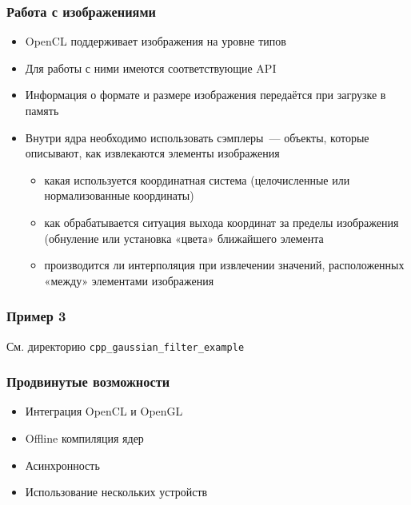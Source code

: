 \documentclass[
    aspectratio=169,
]{beamer}
\begin{document}
\begin{frame}
    \frametitle{Работа с изображениями}

    \begin{itemize}
        \item OpenCL поддерживает изображения на уровне типов
        \item Для работы с ними имеются соответствующие API
        \item Информация о формате и размере изображения передаётся при загрузке в память
        \item Внутри ядра необходимо использовать сэмплеры~--- объекты, которые описывают, как извлекаются элементы изображения
              \begin{itemize}
                  \item какая используется координатная система (целочисленные или нормализованные координаты)
                  \item как обрабатывается ситуация выхода координат за пределы изображения (обнуление или установка «цвета» ближайшего элемента
                  \item производится ли интерполяция при извлечении значений, расположенных «между» элементами изображения
              \end{itemize}
    \end{itemize}

\end{frame}

\begin{frame}
    \frametitle{Пример 3}

    См. директорию \texttt{cpp\_gaussian\_filter\_example}

\end{frame}

\begin{frame}
    \frametitle{Продвинутые возможности}

    \begin{itemize}
        \item Интеграция OpenCL и OpenGL
        \item Offline компиляция ядер
        \item Асинхронность
        \item Использование нескольких устройств
    \end{itemize}

\end{frame}
\end{document}
